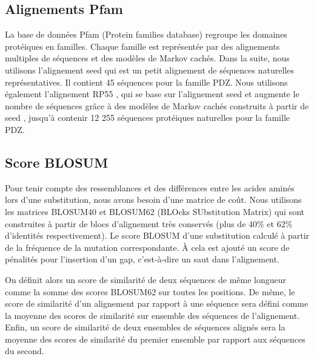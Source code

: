 \subsection{Alignements Pfam}
\label{sec:Align_Pfam}
La base de données Pfam (Protein families database) \cite{Punta12,Finn14} regroupe les domaines protéiques en familles. Chaque famille est représentée par des alignements multiples de séquences et des modèles de Markov cachés. Dans la suite, nous utilisons l'alignement \og seed \fg qui est un petit alignement de séquences naturelles représentatives. Il contient 45 séquences pour la famille PDZ. Nous utilisons également l'alignement \og RP55 \fg, qui se base sur l'alignement \og seed \fg et augmente le nombre de séquences grâce à des  modèles de Markov cachés construits à partir de \og seed \fg, jusqu'à contenir 12 255 séquences protéiques naturelles pour la famille PDZ.

\subsection{Score BLOSUM}

Pour tenir compte des ressemblances et des différences entre les acides aminés lors d'une substitution, nous avons besoin d'une matrice de coût. Nous utilisons les matrices BLOSUM40 et BLOSUM62 (BLOcks SUbstitution Matrix) \cite{Henikoff92} qui sont construites à partir de blocs d'alignement très conservés (plus de 40\% et 62\% d'identités respectivement). Le score BLOSUM d'une substitution calculé à partir de la fréquence de la mutation correspondante. À cela est ajouté un score de pénalités pour l'insertion d'un gap, c'est-à-dire un saut dans l'alignement.

On définit alors un score de similarité de deux séquences de même longueur comme la somme des scores BLOSUM62 sur toutes les positions. De même, le score de similarité d'un alignement par rapport à une séquence sera défini comme la moyenne des scores de similarité sur ensemble des séquences de l'alignement. Enfin, un score de similarité de deux ensembles de séquences alignés sera la moyenne des scores de similarité du premier ensemble par rapport aux séquences du second.  

